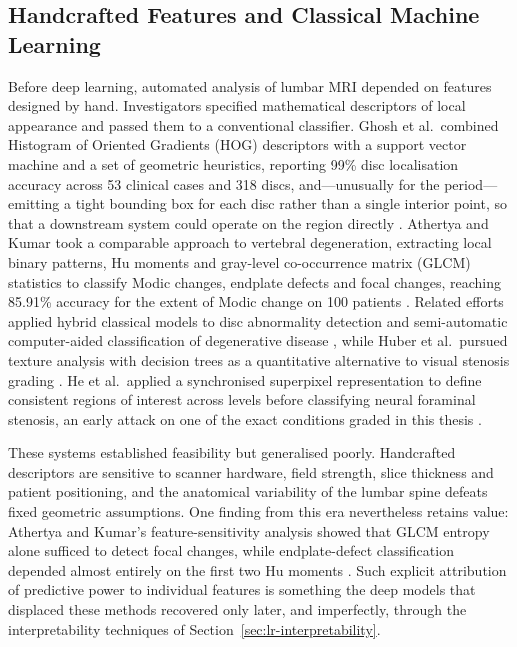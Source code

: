 \subsection{Handcrafted Features and Classical Machine Learning}
\label{sec:lr-classical}

Before deep learning, automated analysis of lumbar MRI depended on features
designed by hand. Investigators specified mathematical descriptors of local
appearance and passed them to a conventional classifier. Ghosh et al.\ combined
Histogram of Oriented Gradients (HOG) descriptors with a support vector machine
and a set of geometric heuristics, reporting 99\% disc localisation accuracy
across 53 clinical cases and 318 discs, and---unusually for the period---emitting
a tight bounding box for each disc rather than a single interior point, so that
a downstream system could operate on the region directly
\cite{ghosh2012a}. Athertya and Kumar took a comparable approach to vertebral
degeneration, extracting local binary patterns, Hu moments and gray-level
co-occurrence matrix (GLCM) statistics to classify Modic changes, endplate
defects and focal changes, reaching 85.91\% accuracy for the extent of Modic
change on 100 patients \cite{athertya2021classification}. Related efforts applied
hybrid classical models to disc abnormality detection
\cite{unal2015detection,castromateos2016intervertebral} and semi-automatic
computer-aided classification of degenerative disease \cite{ruizespaa2015semiautomatic},
while Huber et al.\ pursued texture analysis with decision trees as a
quantitative alternative to visual stenosis grading \cite{huber2019qualitative}.
He et al.\ applied a synchronised superpixel representation to define consistent
regions of interest across levels before classifying neural foraminal stenosis,
an early attack on one of the exact conditions graded in this thesis
\cite{he2016automated}.

These systems established feasibility but generalised poorly. Handcrafted
descriptors are sensitive to scanner hardware, field strength, slice thickness
and patient positioning, and the anatomical variability of the lumbar spine
defeats fixed geometric assumptions. One finding from this era nevertheless
retains value: Athertya and Kumar's feature-sensitivity analysis showed that
GLCM entropy alone sufficed to detect focal changes, while endplate-defect
classification depended almost entirely on the first two Hu moments
\cite{athertya2021classification}. Such explicit attribution of predictive power
to individual features is something the deep models that displaced these methods
recovered only later, and imperfectly, through the interpretability techniques of
Section~\ref{sec:lr-interpretability}.

